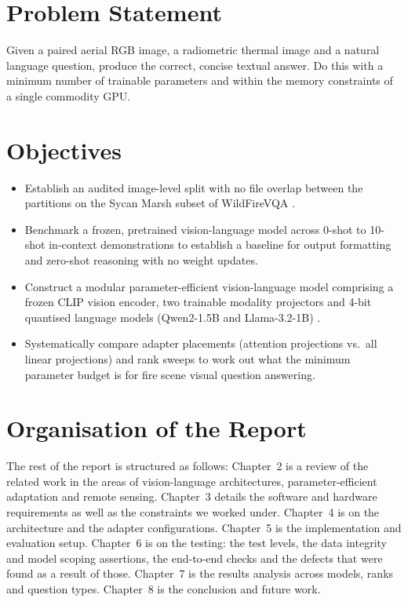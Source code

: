 \documentclass[12pt]{report}
\begin{document}
\section{Problem Statement}
Given a paired aerial RGB image, a radiometric thermal image and a natural language question, produce the correct, concise textual answer. Do this with a minimum number of trainable parameters and within the memory constraints of a single commodity GPU.

\section{Objectives}
\begin{itemize}[leftmargin=0.5in, itemsep=2pt]
  \item Establish an audited image-level split with no file overlap between the partitions on the Sycan Marsh subset of WildFireVQA \cite{wildfirevqa,flame3}.
  \item Benchmark a frozen, pretrained vision-language model across 0-shot to 10-shot in-context demonstrations to establish a baseline for output formatting and zero-shot reasoning with no weight updates.
  \item Construct a modular parameter-efficient vision-language model comprising a frozen CLIP vision encoder, two trainable modality projectors and 4-bit quantised language models (Qwen2-1.5B and Llama-3.2-1B) \cite{mithan,llama32}.
  \item Systematically compare adapter placements (attention projections vs.\ all linear projections) and rank sweeps to work out what the minimum parameter budget is for fire scene visual question answering.
\end{itemize}

\section{Organisation of the Report}
The rest of the report is structured as follows: Chapter~2 is a review of the related work in the areas of vision-language architectures, parameter-efficient adaptation and remote sensing. Chapter~3 details the software and hardware requirements as well as the constraints we worked under. Chapter~4 is on the architecture and the adapter configurations. Chapter~5 is the implementation and evaluation setup. Chapter~6 is on the testing: the test levels, the data integrity and model scoping assertions, the end-to-end checks and the defects that were found as a result of those. Chapter~7 is the results analysis across models, ranks and question types. Chapter~8 is the conclusion and future work.
\end{document}

